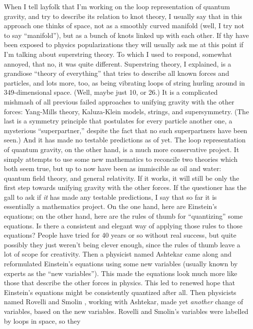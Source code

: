 \documentclass{article}
\begin{document}
When I tell layfolk that I'm working on the loop representation of
quantum gravity, and try to describe its relation to knot theory, I
usually say that in this approach one thinks of space, not as a smoothly
curved manifold (well, I try not to say ``manifold''), but as a bunch of
knots linked up with each other. If thy have been exposed to physics
popularizations they will usually ask me at this point if I'm talking
about superstring theory. To which I used to respond, somewhat annoyed,
that no, it was quite different. Superstring theory, I explained, is a
grandiose ``theory of everything'' that tries to describe all known
forces and particles, and lots more, too, as being vibrating loops of
string hurling around in 349-dimensional space. (Well, maybe just 10, or
26.) It is a complicated mishmash of all previous failed approaches to
unifying gravity with the other forces: Yang-Mills theory, Kaluza-Klein
models, strings, and supersymmetry. (The last is a symmetry principle
that postulates for every particle another one, a mysterious
``superpartner,'' despite the fact that no such superpartners have been
seen.) And it has made no testable predictions as of yet. The loop
representation of quantum gravity, on the other hand, is a much more
conservative project. It simply attempts to use some new mathematics to
reconcile two theories which both seem true, but up to now have been as
immiscible as oil and water: quantum field theory, and general
relativity. If it works, it will still be only the first step towards
unifying gravity with the other forces. If the questioner has the gall
to ask if \emph{it} has made any testable predictions, I say that so far
it is essentially a mathematics project. On the one hand, here are
Einstein's equations; on the other hand, here are the rules of thumb for
``quantizing'' some equations. Is there a consistent and elegant way of
applying those rules to those equations? People have tried for 40 years
or so without real success, but quite possibly they just weren't being
clever enough, since the rules of thumb leave a lot of scope for
creativity. Then a physicist named Ashtekar came along and reformulated
Einstein's equations using some new variables (usually known by experts
as the ``new variables''). This made the equations look much more like
those that describe the other forces in physics. This led to renewed
hope that Einstein's equations might be consistently quantized after
all. Then physicists named Rovelli and Smolin , working with Ashtekar,
made yet \emph{another} change of variables, based on the new variables.
Rovelli and Smolin's variables were labelled by loops in space, so they
\end{document}
